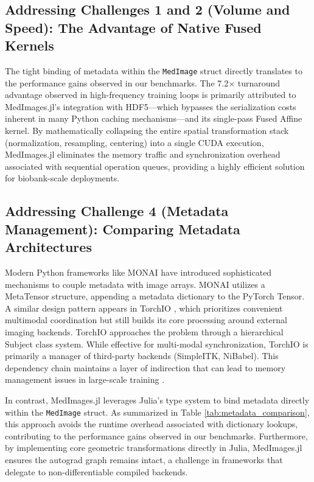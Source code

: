 \documentclass[10pt,letterpaper]{article}
\begin{document}
\subsection*{Addressing Challenges 1 and 2 (Volume and Speed): The Advantage of Native Fused Kernels}
The tight binding of metadata within the \texttt{MedImage} struct directly translates to the performance gains observed in our benchmarks. The 7.2$\times$ turnaround advantage observed in high-frequency training loops is primarily attributed to MedImages.jl's integration with HDF5---which bypasses the serialization costs inherent in many Python caching mechanisms---and its single-pass Fused Affine kernel. By mathematically collapsing the entire spatial transformation stack (normalization, resampling, centering) into a single CUDA execution, MedImages.jl eliminates the memory traffic and synchronization overhead associated with sequential operation queues, providing a highly efficient solution for biobank-scale deployments.

\subsection*{Addressing Challenge 4 (Metadata Management): Comparing Metadata Architectures}
Modern Python frameworks like MONAI \cite{CardosoLi2022} have introduced sophisticated mechanisms to couple metadata with image arrays. MONAI utilizes a MetaTensor structure, appending a metadata dictionary to the PyTorch Tensor. A similar design pattern appears in TorchIO \cite{perezgarcia2021torchio}, which prioritizes convenient multimodal coordination but still builds its core processing around external imaging backends. TorchIO approaches the problem through a hierarchical Subject class system. While effective for multi-modal synchronization, TorchIO is primarily a manager of third-party backends (SimpleITK, NiBabel). This dependency chain maintains a layer of indirection that can lead to memory management issues in large-scale training \cite{perezgarcia2021torchio}.

In contrast, MedImages.jl leverages Julia's type system to bind metadata directly within the \texttt{MedImage} struct. As summarized in Table \ref{tab:metadata_comparison}, this approach avoids the runtime overhead associated with dictionary lookups, contributing to the performance gains observed in our benchmarks. Furthermore, by implementing core geometric transformations directly in Julia, MedImages.jl ensures the autograd graph remains intact, a challenge in frameworks that delegate to non-differentiable compiled backends.
\end{document}
